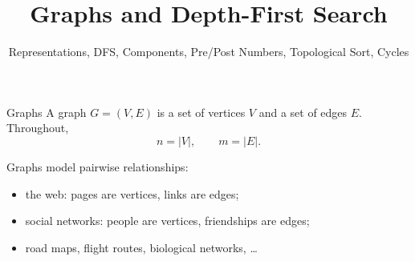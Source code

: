 \documentclass[10pt,aspectratio=169]{beamer}
\title{Graphs and Depth-First Search}
\subtitle{Representations, DFS, Components, Pre/Post Numbers, Topological Sort, Cycles}
\date{}
\author{}
\begin{document}
\maketitle

\begin{frame}{Graphs}
  A \alert{graph} $G = (V, E)$ is a set of vertices $V$ and a set of edges $E$.
  Throughout,
  \[
    n = |V|, \qquad m = |E|.
  \]

  \pause
  \bigskip
  Graphs model \alert{pairwise relationships}:
  \begin{itemize}
    \item the web: pages are vertices, links are edges;
    \item social networks: people are vertices, friendships are edges;
    \item road maps, flight routes, biological networks, \ldots
  \end{itemize}
\end{frame}
\end{document}

